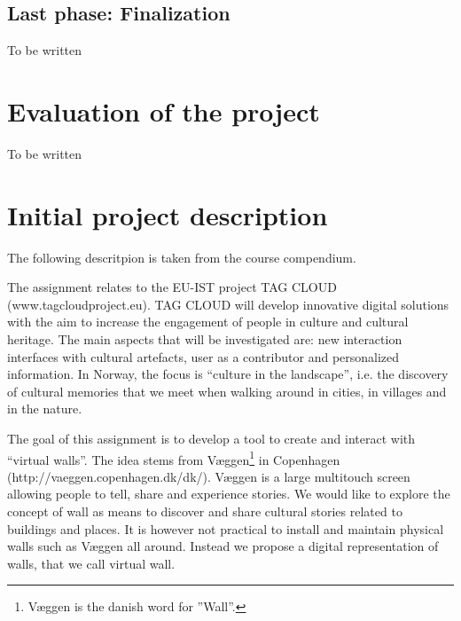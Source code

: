\documentclass[11pt]{book}
\begin{document}
\section{Last phase: Finalization}
To be written

\chapter{Evaluation of the project}
To be written



\glsaddall
{}
\printglossaries

\appendix
\chapter{Initial project description}
The following descritpion is taken from the course compendium\cite[p. 47]{compendium}.

The assignment relates to the EU-IST project TAG CLOUD (www.tagcloudproject.eu). TAG CLOUD will develop innovative digital solutions with the aim to increase the engagement of people in culture and cultural heritage. The main aspects that will be investigated are: new interaction interfaces with cultural artefacts, user as a contributor and personalized information. In Norway, the focus is “culture in the landscape”, i.e. the discovery of cultural memories that we meet when walking around in cities, in villages and in the nature.

The goal of this assignment is to develop a tool to create and interact with “virtual walls”. The idea stems from Væggen\footnote{Væggen is the danish word for ”Wall”.} in Copenhagen (http://vaeggen.copenhagen.dk/dk/). Væggen is a large multitouch screen allowing people to tell, share and experience stories. We would like to explore the concept of wall as means to discover and share cultural stories related to buildings and places. It is however not practical to install and maintain physical walls such as Væggen all around. Instead we propose a digital representation of walls, that we call virtual wall.
\end{document}

